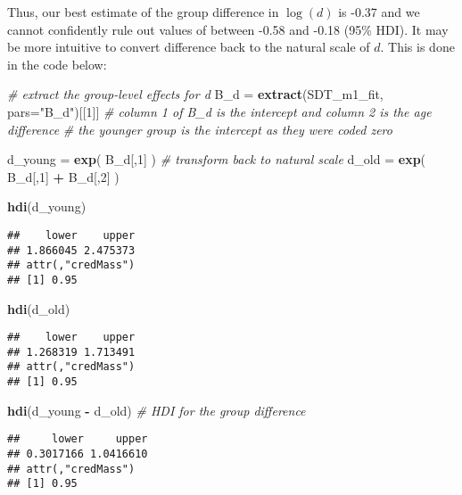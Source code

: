 \documentclass[
  english,
  ,man,floatsintext]{apa6}
\newenvironment{Shaded}{\begin{snugshade}}{\end{snugshade}}
\newcommand{\CommentTok}[1]{\textcolor[rgb]{0.56,0.35,0.01}{\textit{#1}}}
\newcommand{\DataTypeTok}[1]{\textcolor[rgb]{0.13,0.29,0.53}{#1}}
\newcommand{\DecValTok}[1]{\textcolor[rgb]{0.00,0.00,0.81}{#1}}
\newcommand{\KeywordTok}[1]{\textcolor[rgb]{0.13,0.29,0.53}{\textbf{#1}}}
\newcommand{\NormalTok}[1]{#1}
\newcommand{\OperatorTok}[1]{\textcolor[rgb]{0.81,0.36,0.00}{\textbf{#1}}}
\newcommand{\StringTok}[1]{\textcolor[rgb]{0.31,0.60,0.02}{#1}}
\begin{document}
Thus, our best estimate of the group difference in \(\log(d)\) is -0.37 and we cannot confidently rule out values of between -0.58 and -0.18 (95\% HDI). It may be more intuitive to convert difference back to the natural scale of \(d\). This is done in the code below:

\begin{Shaded}
\begin{Highlighting}[]
\CommentTok{# extract the group-level effects for d}
\NormalTok{B_d =}\StringTok{ }\KeywordTok{extract}\NormalTok{(SDT_m1_fit, }\DataTypeTok{pars=}\StringTok{"B_d"}\NormalTok{)[[}\DecValTok{1}\NormalTok{]]}
\CommentTok{# column 1 of B_d is the intercept and column 2 is the age difference}
\CommentTok{# the younger group is the intercept as they were coded zero}

\NormalTok{d_young =}\StringTok{ }\KeywordTok{exp}\NormalTok{( B_d[,}\DecValTok{1}\NormalTok{] ) }\CommentTok{# transform back to natural scale}
\NormalTok{d_old =}\StringTok{ }\KeywordTok{exp}\NormalTok{( B_d[,}\DecValTok{1}\NormalTok{] }\OperatorTok{+}\StringTok{ }\NormalTok{B_d[,}\DecValTok{2}\NormalTok{] )}

\KeywordTok{hdi}\NormalTok{(d_young)}
\end{Highlighting}
\end{Shaded}

\begin{verbatim}
##    lower    upper 
## 1.866045 2.475373 
## attr(,"credMass")
## [1] 0.95
\end{verbatim}

\begin{Shaded}
\begin{Highlighting}[]
\KeywordTok{hdi}\NormalTok{(d_old)}
\end{Highlighting}
\end{Shaded}

\begin{verbatim}
##    lower    upper 
## 1.268319 1.713491 
## attr(,"credMass")
## [1] 0.95
\end{verbatim}

\begin{Shaded}
\begin{Highlighting}[]
\KeywordTok{hdi}\NormalTok{(d_young }\OperatorTok{-}\StringTok{ }\NormalTok{d_old) }\CommentTok{# HDI for the group difference}
\end{Highlighting}
\end{Shaded}

\begin{verbatim}
##     lower     upper 
## 0.3017166 1.0416610 
## attr(,"credMass")
## [1] 0.95
\end{verbatim}
\end{document}
